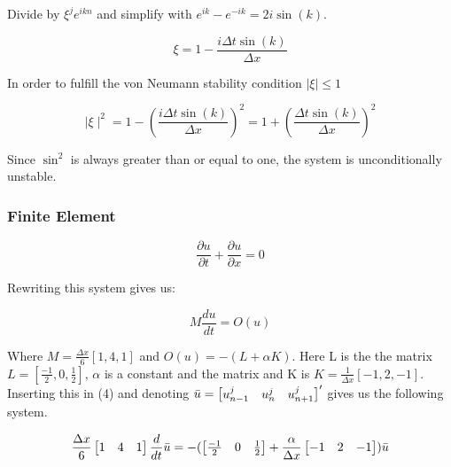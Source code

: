 \documentclass[a4paper,10pt,twoside]{article}
\begin{document}
Divide by $\xi^j e^{ikn}$ and simplify with $e^{ik} - e^{-ik} = 2i \sin(k)$.

\begin{equation}
    \xi = 1 - \frac{i\Delta t \sin(k)}{ \Delta x}
\end{equation}

In order to fulfill the von Neumann stability condition $\mid\xi\mid \leq 1$

\begin{equation}
    \mid \xi \mid^2 = 1 - \left(\frac{i\Delta t \sin(k)}{ \Delta x}\right)^2 = 1 + \left(\frac{\Delta t \sin(k)}{\Delta x}\right)^2
\end{equation}

Since $\sin^2$ is always greater than or equal to one, the system is unconditionally unstable.

\subsubsection{Finite Element}
\begin{equation}
    \frac{\partial u}{\partial t} + \frac{\partial u}{\partial x} = 0
\end{equation}

Rewriting this system gives us:

\begin{equation}
    M\frac{du}{dt} = O(u)
\end{equation}

Where $M = \frac{\Delta x}{6}[1, 4, 1]$ and $O(u) = -(L+\alpha K)$. Here L is the the matrix $L = [\frac{-1}{2}, 0, \frac{1}{2}]$, $\alpha$ is a constant and the matrix and K is $K = \frac{1}{\Delta x}[-1, 2, -1]$. Inserting this in (4) and denoting $\Bar{u} = \begin{bmatrix} u_{n-1}^j & u_{n}^j & u_{n+1}^j \end{bmatrix}'$ gives us the following system.

\begin{equation}
    \frac{\Delta x}{6}
    \begin{bmatrix}
        1 & 4 & 1
    \end{bmatrix}    
    \frac{d}{dt} \Bar{u} =
    -(\begin{bmatrix}
        \frac{-1}{2} & 0 & \frac{1}{2}
    \end{bmatrix}
    + \frac{\alpha}{\Delta x} 
    \begin{bmatrix}
        -1 & 2 & -1
    \end{bmatrix})
    \Bar{u}
\end{equation}
\end{document}
